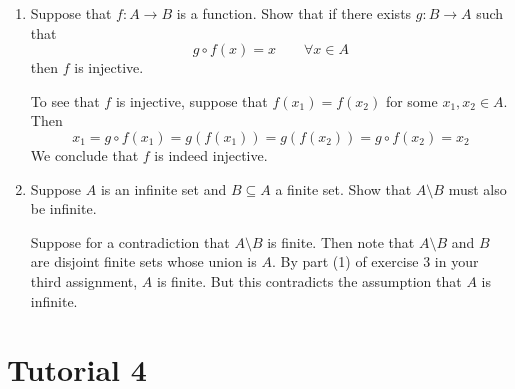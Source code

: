 \documentclass[12pt, reqno]{article}
\numberwithin{equation}{section}
\theoremstyle{definition}
\theoremstyle{remark}
\begin{document}
\begin{enumerate}[leftmargin=*]
	\item Suppose that $f:A\to B$ is a function. Show that if there exists $g:B\to A$ such that
	      \[
		      g\circ f(x) = x \qquad \forall x\in A
	      \]
	      then $f$ is injective.

	      To see that $f$ is injective, suppose that $f(x_1) = f(x_2)$ for some $x_1, x_2\in A$. Then
	      \[
		      x_1 = g\circ f(x_1) = g(f(x_1)) = g(f(x_2)) = g\circ f(x_2) = x_2
	      \]
	      We conclude that $f$ is indeed injective.

	\item Suppose $A$ is an infinite set and $B\subseteq A$ a finite set. Show that $A\setminus B$ must also be infinite.

	      Suppose for a contradiction that $A\setminus B$ is finite. Then note that $A\setminus B$ and $B$ are disjoint finite sets whose union is $A$. By part (1) of exercise 3 in your third assignment, $A$ is finite. But this contradicts the assumption that $A$ is infinite.
\end{enumerate}

\section*{Tutorial 4}
\end{document}

